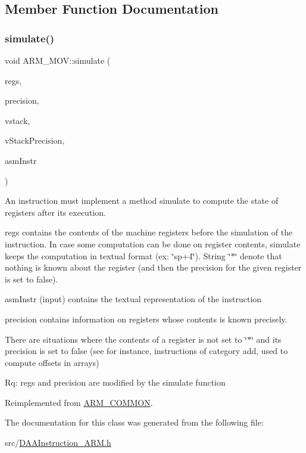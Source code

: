 \subsection{Member Function Documentation}
\mbox{\label{classARM__MOV_acbf1dba49a5e4d834e41d5e834ff7e5a}} 
\subsubsection{\texorpdfstring{simulate()}{simulate()}}
{\footnotesize\ttfamily void A\+R\+M\+\_\+\+M\+O\+V\+::simulate (\begin{DoxyParamCaption}\item[{\hyperlink{DAAInstruction_8h_af0fae93a861de9cf37988d5673cac523}{reg\+Table} \&}]{regs,  }\item[{\hyperlink{DAAInstruction_8h_a0e8cae02815a5f8adc750122d790b455}{reg\+Precision\+Table} \&}]{precision,  }\item[{\hyperlink{DAAInstruction_8h_a1b0e70ac1a04f06c8132055ed01f589f}{stack\+Type} \&}]{vstack,  }\item[{\hyperlink{DAAInstruction_8h_ac5cb793e9dac3fa9693da78b7e29ab30}{stack\+Prec\+Type} \&}]{v\+Stack\+Precision,  }\item[{const string \&}]{asm\+Instr }\end{DoxyParamCaption})\hspace{0.3cm}{\ttfamily [virtual]}}

An instruction must implement a method simulate to compute the state of registers after its execution.

regs contains the contents of the machine registers before the simulation of the instruction. In case some computation can be done on register contents, simulate keeps the computation in textual format (ex\+: \char`\"{}sp+4\char`\"{}). String \char`\"{}$\ast$\char`\"{} denote that nothing is known about the register (and then the precision for the given register is set to false).

asm\+Instr (input) contains the textual representation of the instruction

precision contains information on registers whose contents is known precisely.

There are situations where the contents of a register is not set to \char`\"{}$\ast$\char`\"{} and its precision is set to false (see for instance, instructions of category add, used to compute offsets in arrays)

Rq\+: regs and precision are modified by the simulate function 

Reimplemented from \hyperlink{classARM__COMMON_a89eb552311ce787557a976aee2fa2db6}{A\+R\+M\+\_\+\+C\+O\+M\+M\+ON}.



The documentation for this class was generated from the following file\+:\begin{DoxyCompactItemize}
\item 
src/\hyperlink{DAAInstruction__ARM_8h}{D\+A\+A\+Instruction\+\_\+\+A\+R\+M.\+h}\end{DoxyCompactItemize}
